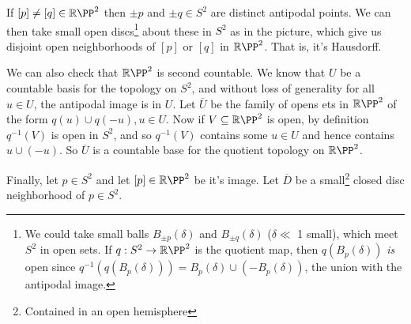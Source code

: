 \documentclass[a4paper]{scrartcl}
\begin{document}
\begin{example}
\begin{center}
        
            \end{center}
        

    If $[p] \neq [q] \in \mathbb{R}\PP^2$ then $\pm p$ and $\pm q \in S^2$ are distinct antipodal points. We can then take small open discs\footnote{We could take small balls $B_{\pm p}(\delta)$ and $B_{\pm q}(\delta)$ ($\delta \ll$ 1 small), which meet $S^2$ in open sets. If $q: S^2 \rightarrow \mathbb{R}\PP^2$ is the quotient map, then $q(B_{p}(\delta))$ \emph{is} open since $q^{-1}(q(B_{p}(\delta))) = B_{p}(\delta) \cup (-B_{p}(\delta))$, the union with the antipodal image.} about these in $S^2$ as in the picture, which give us disjoint open neighborhoods of $[p]$ or $[q]$ in $\mathbb{R} \PP^2$. That is, it's Hausdorff.

    We can also check that $\mathbb{R}\PP^2$ is second countable. We know that $U$ be a countable basis for the topology on $S^2$, and without loss of generality for all $u \in U$, the antipodal image is in $U$.
    Let $\overline{U}$ be the family of opens ets in $\mathbb{R}\PP^2$ of the form $q(u) \cup q(-u), u \in U$.
    Now if $V \subseteq \mathbb{R}\PP^2$ is open, by definition $q^{-1}(V)$ is open in $S^2$, and so $q^{-1}(V)$ contains some $u \in U$ and hence contains $u \cup (-u)$. So $\overline{U}$ is a countable base for the quotient topology on $\mathbb{R}\PP^2$.

    Finally, let $p \in S^2$ and let $[p] \in \mathbb{R}\PP^2$ be it's image.
    Let $\overline{D}$ be a small\footnote{Contained in an open hemisphere} closed disc neighborhood of $p \in S^2$.

    \begin{center}
        

  


\end{center}
\end{example}
\end{document}
